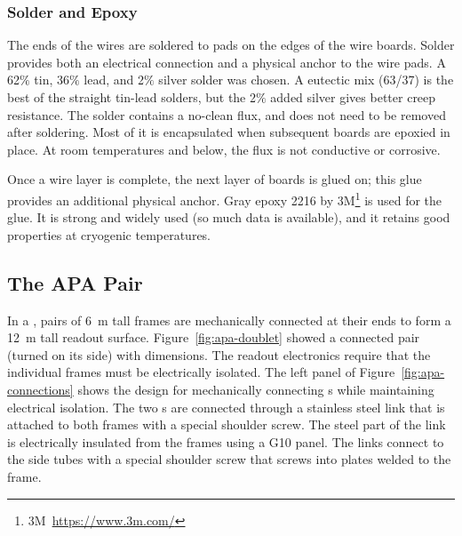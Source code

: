\subsubsection{Solder and Epoxy}
\label{sec:glue-solder}

The ends of the wires are soldered to pads on the edges of the wire boards.  Solder provides both an electrical connection and a physical anchor to the wire pads. A 62$\%$ tin, 36$\%$ lead, and 2$\%$ silver solder was chosen.  A eutectic mix (63/37) is the best of the straight tin-lead solders, but the 2$\%$ added silver gives better creep resistance.  The solder contains a no-clean flux, and does not need to be removed after soldering. Most of it is encapsulated when subsequent boards are epoxied in place.  At room temperatures and below, the flux is not conductive or corrosive.

Once a wire layer is complete, the next layer of boards is glued on; this glue provides an additional physical anchor. Gray epoxy \num{2216} by 3M\footnote{3M\texttrademark ~\url{https://www.3m.com/}} is used for the glue.  It is strong and widely used (so much data is available), and it retains good properties at cryogenic temperatures.  



\subsection{The APA Pair} %
\label{sec:fdsp-apa-intfc-apa}


In a  , pairs of \SI{6}{m} tall  frames are mechanically connected at their ends to form a \SI{12}{m} tall readout surface.  Figure~\ref{fig:apa-doublet} showed a connected pair (turned on its side) with dimensions.  The  readout electronics require that the individual  frames must be electrically isolated.   The left panel of Figure~\ref{fig:apa-connections} shows the design for mechanically connecting s while maintaining electrical isolation.  The two s are connected through a stainless steel link that is attached to both frames with a special shoulder screw.  The steel part of the link is electrically insulated from the frames using a G10 panel.  The links connect to the side tubes with a special shoulder screw that screws into plates welded to the frame.  %

